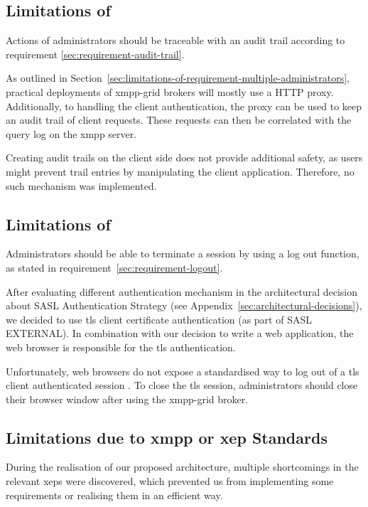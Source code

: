 \subsection{Limitations of \emph{}}

Actions of administrators should be traceable with an audit trail according to requirement \ref{sec:requirement-audit-trail}.

As outlined in Section~\ref{sec:limitations-of-requirement-multiple-administrators}, practical deployments of \gls{xmpp-grid} \glspl{broker} will mostly use a HTTP proxy.
Additionally, to handling the client authentication, the proxy can be used to keep an audit trail of client requests.
These requests can then be correlated with the query log on the \gls{xmpp} server.

Creating audit trails on the client side does not provide additional safety, as users might prevent trail entries by manipulating the client application.
Therefore, no such mechanism was implemented.


\subsection{Limitations of \emph{}}

Administrators should be able to terminate a session by using a log out function, as stated in requirement~\ref{sec:requirement-logout}.

After evaluating different authentication mechanism in the architectural decision about SASL Authentication Strategy (see Appendix~\ref{sec:architectural-decisions}), we decided to use \gls{tls} client certificate authentication (as part of SASL EXTERNAL). In combination with our decision to write a web application, the web browser is responsible for the \gls{tls} authentication.

Unfortunately, web browsers do not expose a standardised way to log out of a \gls{tls} client authenticated session \cite{practical-issues-with-tls-client}.
To close the \gls{tls} session, administrators should close their browser window after using the \gls{xmpp-grid} \gls{broker}.

\subsection{Limitations due to \gls{xmpp} or \gls{xep} Standards}

During the realisation of our proposed architecture, multiple shortcomings in the relevant \glspl{xep} were discovered, which prevented us from implementing some requirements or realising them in an efficient way.

